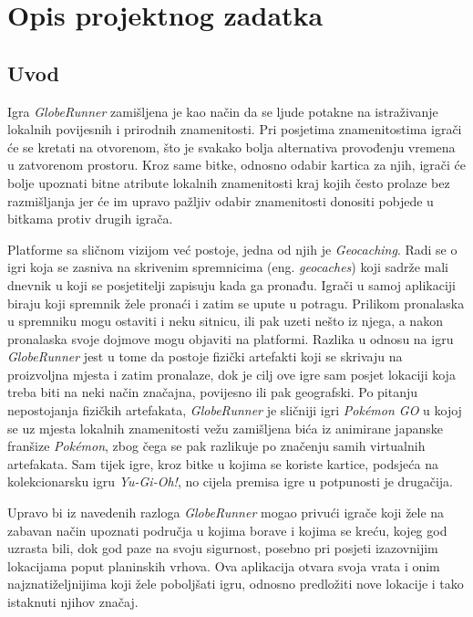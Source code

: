 \chapter{Opis projektnog zadatka}
    \section{Uvod}
		
		Igra \textit{GlobeRunner} zamišljena je kao način da se ljude potakne na istraživanje lokalnih povijesnih i prirodnih znamenitosti. Pri posjetima znamenitostima igrači će se kretati na otvorenom, što je svakako bolja alternativa provođenju vremena u zatvorenom prostoru. Kroz same bitke, odnosno odabir kartica za njih, igrači će bolje upoznati bitne atribute lokalnih znamenitosti kraj kojih često prolaze bez razmišljanja jer će im upravo pažljiv odabir znamenitosti donositi pobjede u bitkama protiv drugih igrača.\par
		
		Platforme sa sličnom vizijom već postoje, jedna od njih je \textit{Geocaching}. Radi se o igri koja se zasniva na skrivenim spremnicima (eng. \textit{geocaches}) koji sadrže mali dnevnik u koji se posjetitelji zapisuju kada ga pronađu. Igrači u samoj aplikaciji biraju koji spremnik žele pronaći i zatim se upute u potragu. Prilikom pronalaska u spremniku mogu ostaviti i neku sitnicu, ili pak uzeti nešto iz njega, a nakon pronalaska svoje dojmove mogu objaviti na platformi. Razlika u odnosu na igru \textit{GlobeRunner} jest u tome da postoje fizički artefakti koji se skrivaju na proizvoljna mjesta i zatim pronalaze, dok je cilj ove igre sam posjet lokaciji koja treba biti na neki način značajna, povijesno ili pak geografski. Po pitanju nepostojanja fizičkih artefakata, \textit{GlobeRunner} je sličniji igri \textit{Pokémon GO} u kojoj se uz mjesta lokalnih znamenitosti vežu zamišljena bića iz animirane japanske franšize \textit{Pokémon}, zbog čega se pak razlikuje po značenju samih virtualnih artefakata. Sam tijek igre, kroz bitke u kojima se koriste kartice, podsjeća na kolekcionarsku igru \textit{Yu-Gi-Oh!}, no cijela premisa igre u potpunosti je drugačija.
		
		Upravo bi iz navedenih razloga \textit{GlobeRunner} mogao privući igrače koji žele na zabavan način upoznati područja u kojima borave i kojima se kreću, kojeg god uzrasta bili, dok god paze na svoju sigurnost, posebno pri posjeti izazovnijim lokacijama poput planinskih vrhova. Ova aplikacija otvara svoja vrata i onim najznatiželjnijima koji žele poboljšati igru, odnosno predložiti nove lokacije i tako istaknuti njihov značaj.
		
